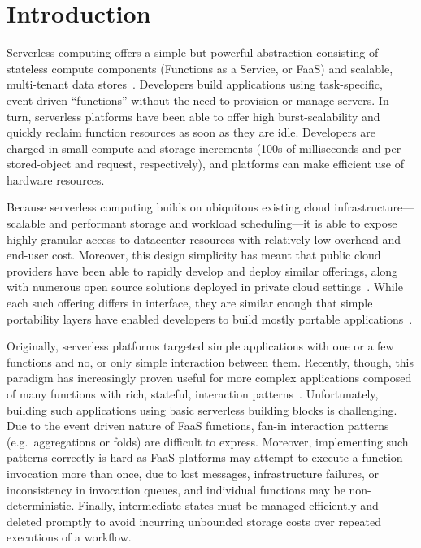 \section{Introduction}\label{sec:intro}

Serverless computing offers a simple but powerful abstraction consisting of
stateless compute components (Functions as a Service, or FaaS) and scalable,
multi-tenant data stores~\cite{berkeley}. Developers build applications using
task-specific, event-driven ``functions'' without the need to provision or
manage servers. In turn, serverless platforms have been able to offer high
burst-scalability and quickly reclaim function resources as soon as they are
idle. Developers are charged in small compute and storage increments (100s of
milliseconds and per-stored-object and request, respectively), and platforms
can make efficient use of hardware resources.

Because serverless computing builds on ubiquitous existing cloud
infrastructure---scalable and performant storage and workload scheduling---it is
able to expose highly granular access to datacenter resources with relatively
low overhead and end-user cost. Moreover, this design simplicity has meant that
public cloud providers have been able to rapidly develop and deploy similar
offerings, along with numerous open source solutions deployed in private cloud
settings~\cite{aws-lambda,gcp-functions,azure-functions,openwhisk,openfaas}.
While each such offering differs in interface, they are similar enough that
simple portability layers have enabled developers to build mostly portable
applications~\cite{boto3,serverless-framework}.

Originally, serverless platforms targeted simple applications with one or a few
functions and no, or only simple interaction between them. Recently, though,
this paradigm has increasingly proven useful for more complex applications
composed of many functions with rich, stateful, interaction
patterns~\cite{excamera, pywren, gg-atc, beldi, boki}. Unfortunately, building
such applications using basic serverless building blocks is challenging.  Due to
the event driven nature of FaaS functions, fan-in interaction patterns (e.g.\
aggregations or folds) are difficult to express. Moreover, implementing such
patterns correctly is hard as FaaS platforms may attempt to execute a function
invocation more than once, due to lost messages, infrastructure failures, or
inconsistency in invocation queues, and individual functions may be
non-deterministic.  Finally, intermediate states must be managed efficiently and
deleted promptly to avoid incurring unbounded storage costs over repeated
executions of a workflow.

